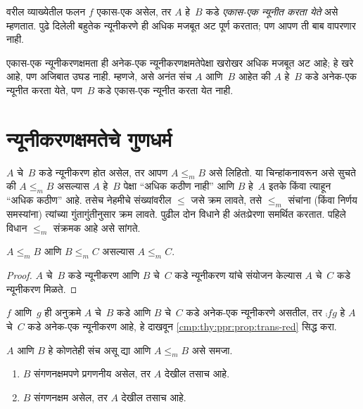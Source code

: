 वरील व्याख्येतील फलन $f$ एकास-एक असेल, तर $A$ हे~$B$
कडे \emph{एकास-एक न्यूनीत करता येते} असे म्हणतात.
पुढे दिलेली बहुतेक न्यूनीकरणे ही अधिक मजबूत अट पूर्ण करतात;
पण आपण ती बाब वापरणार नाही.

\begin{digress}
एकास-एक न्यूनीकरणक्षमता ही अनेक-एक न्यूनीकरणक्षमतेपेक्षा खरोखर
अधिक मजबूत अट आहे; हे खरे आहे, पण अजिबात उघड नाही. म्हणजे,
असे अनंत संच $A$ आणि~$B$ आहेत की $A$ हे~$B$ कडे अनेक-एक
न्यूनीत करता येते, पण~$B$ कडे एकास-एक न्यूनीत करता येत नाही.
\end{digress}











\section{न्यूनीकरणक्षमतेचे गुणधर्म}\label{cmp:thy:ppr:sec}

$A$ चे~$B$ कडे न्यूनीकरण होत असेल, तर आपण $A \leq_m B$
असे लिहितो. या चिन्हांकनावरून असे सुचते की $A \leq_m B$
असल्यास $A$ हे~$B$ पेक्षा ``अधिक कठीण नाही'' आणि $B$
हे~$A$ इतके किंवा त्याहून ``अधिक कठीण'' आहे. तसेच नेहमीचे
संख्यांवरील $\le$ जसे क्रम लावते, तसे $\le_m$ संचांना
(किंवा निर्णय समस्यांना) त्यांच्या गुंतागुंतीनुसार क्रम लावते.
पुढील दोन विधाने ही अंतःप्रेरणा समर्थित करतात. पहिले विधान
$\le_m$ संक्रमक आहे असे सांगते.

\begin{prop}
\label{cmp:thy:ppr:prop:trans-red}
$A \leq_m B$ आणि $B \leq_m C$ असल्यास $A \leq_m C$.
\end{prop}

\begin{proof}
$A$ चे~$B$ कडे न्यूनीकरण आणि $B$ चे~$C$ कडे न्यूनीकरण
यांचे संयोजन केल्यास $A$ चे~$C$ कडे न्यूनीकरण मिळते.
\end{proof}

\begin{prob}
$f$ आणि~$g$ ही अनुक्रमे $A$ चे~$B$ कडे आणि $B$ चे~$C$
कडे अनेक-एक न्यूनीकरणे असतील, तर $\comp{f}{g}$ हे $A$
चे~$C$ कडे अनेक-एक न्यूनीकरण आहे, हे दाखवून
\ref{cmp:thy:ppr:prop:trans-red} सिद्ध करा.
\end{prob}

\begin{prop}
\label{cmp:thy:ppr:prop:reduce}
$A$ आणि $B$ हे कोणतेही संच असू द्या आणि $A \leq_m B$
असे समजा.
\begin{enumerate}
\item $B$ संगणनक्षमपणे प्रगणनीय असेल, तर $A$ देखील तसाच आहे.
\item $B$ संगणनक्षम असेल, तर $A$ देखील तसाच आहे.
\end{enumerate}
\end{prop}

